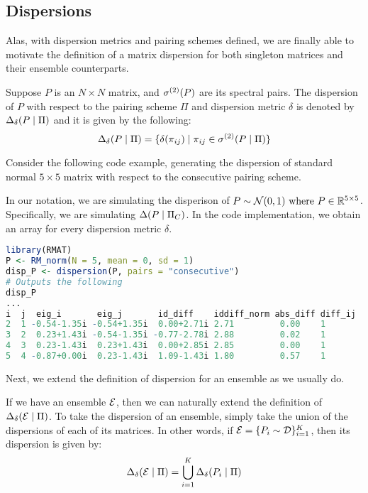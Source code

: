 \newpage
\subsection{Dispersions}

Alas, with dispersion metrics and pairing schemes defined, we are finally able to motivate the definition of a matrix dispersion for both singleton matrices and their ensemble counterparts.

\begin{definition}[Dispersion]
Suppose $P$ is an $N \times N$ matrix, and ${\sigma^{(2)}}(P)$ are its spectral pairs. The dispersion of $P$ with respect to the pairing scheme $\Pi$ and dispersion metric $\delta$ is denoted by $\Delta_\delta(P \mid \Pi)$ and it is given by the following:
$$\Delta_\delta(P \mid \Pi) = \{\delta({\pi_{ij}}) \mid {\pi_{ij}} \in {\sigma^{(2)}}(P \mid \Pi)\}$$
\end{definition}

Consider the following code example, generating the dispersion of standard normal $5 \times 5$ matrix with respect to the consecutive pairing scheme.

\begin{code}
In our notation, we are simulating the disperison of $P \sim \mathcal{N}(0,1) \text{ where } P \in \mathbb{R}^{5 \times 5}$. Specifically, we are simulating $\Delta(P \mid \Pi_C)$. In the code implementation, we obtain an array for every dispersion metric $\delta$.
\end{code}
\begin{lstlisting}[language=R]
library(RMAT)
P <- RM_norm(N = 5, mean = 0, sd = 1)
disp_P <- dispersion(P, pairs = "consecutive")
# Outputs the following
disp_P
...
i  j  eig_i       eig_j       id_diff    iddiff_norm abs_diff diff_ij
2  1 -0.54-1.35i -0.54+1.35i  0.00+2.71i 2.71         0.00    1
3  2  0.23+1.43i -0.54-1.35i -0.77-2.78i 2.88         0.02    1
4  3  0.23-1.43i  0.23+1.43i  0.00+2.85i 2.85         0.00    1
5  4 -0.87+0.00i  0.23-1.43i  1.09-1.43i 1.80         0.57    1
\end{lstlisting}

Next, we extend the definition of dispersion for an ensemble as we usually do.

\begin{definition}
If we have an ensemble $\mathcal{E}$, then we can naturally extend the definition of $\Delta_\delta(\mathcal{E} \mid \Pi)$. To take the dispersion of an ensemble, simply take the union of the dispersions of each of its matrices. In other words, if $\mathcal{E} = \{P_i \sim \mathcal{D}\}_{i = 1}^K$, then its dispersion is given by:
$$\Delta_\delta(\mathcal{E} \mid \Pi) = \bigcup_{i=1}^K \Delta_\delta(P_i \mid \Pi)$$
\end{definition}

